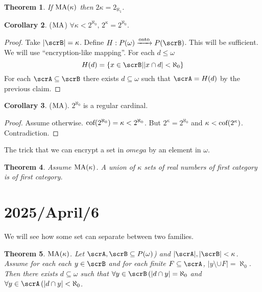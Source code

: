 \documentclass[11pt,pdftex,twoside,a4paper]{article}
\newcommand{\MA}{\ensuremath{\mathop{\rm MA}\nolimits}}
\newtheorem{thm}{Theorem}[section]
\theoremstyle{definition}
\newtheorem{corollary}[thm]{Corollary}
\begin{document}
\begin{thm}
If \(\MA(\kappa)\) then \(2\kappa = 2_{\aleph_1}\).
\end{thm}
\begin{corollary}
(\(\MA\)) \(\forall \kappa < 2^{\aleph_0},\,2^\kappa = 2^{\aleph_0}\).
\end{corollary}
\begin{proof}
Take \(|\scrB|=\kappa\).
Define \(H: P(\omega) \xrightarrow{\text{onto}} P(\scrB)\).
This will be sufficient. We will use ``encryption-like mapping''.
For each \(d\leq\omega\)
\begin{equation*}
H(d) = \{x\in\scrB| |x\cap d| < \aleph_0\}
\end{equation*}
For each \(\scrA\subseteq\scrB\) there exists \(d\subseteq\omega\)
such that \(\scrA = H(d)\) by the previous claim.
\end{proof}
\begin{corollary}
 (\MA). \(2^{\aleph_0}\) is a regular cardinal.
\end{corollary}
\begin{proof}
Assume otherwise. \(\textnormal{cof}(2^{\aleph_0})=\kappa < 2^{\aleph_0}\).
But \(2^\kappa = 2^{\aleph_0}\) and \(\kappa < \textnormal{cof}(2^\kappa)\).
Contradiction.
\end{proof}

The trick that we can encrypt a set in \(omega\) by an element in \(\omega\).

\begin{thm}
Assume \(\MA(\kappa)\).
A union of \(\kappa\) sets of real numbers of first category
is of first category.
\end{thm}


\section{2025/April/6}


We will see how some set can separate between two families.

\begin{thm} \label{thm:MAk:AB:sepd}
\(\MA(\kappa)\).
Let \(\scrA,\scrB \subseteq P(\omega)\)) and \(|\scrA|,|\scrB| < \kappa\).
Assume for each each \(y\in\scrB\) and for each finite \(F\subseteq \scrA\),
\(|y \setminus \cup F|=\aleph_0\).
Then there exists \(d\subseteq \omega\) such that 
\(\forall y\in\scrB\,(|d\cap y|=\aleph_0\) and
\(\forall y\in\scrA\,(|d\cap y|<\aleph_0\).
\end{thm}
\end{document}
